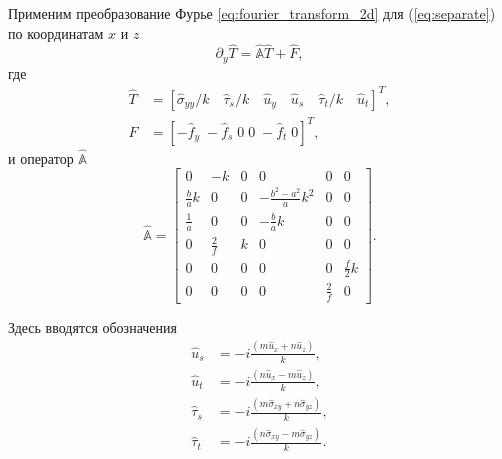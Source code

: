 Применим преобразование Фурье \eqref{eq:fourier_transform_2d} для (\ref{eq:separate}) по координатам $x$ и $z$
\begin{equation}
    \label{eq:FT_system}
    \partial_y \hat{T} = \hat{\mathbb{A}} \hat{T} + \hat{F},
\end{equation}
где
\begin{equation}
    \label{eq:FourierT}
    \begin{split}
        \hat{T} &= \left[\hat{\sigma}_{yy}/k \quad \hat{\tau}_s/k \quad \hat{u}_y \quad \hat{u}_s \quad  \hat{\tau}_t/k \quad  \hat{u}_t \right]^T, \\
        F &= \left[-\hat{f}_y \; -\hat{f}_s \; 0 \; 0 \; -\hat{f}_t \; 0\right]^T,
    \end{split}
\end{equation}
и оператор $\hat{\mathbb{A}}$
\begin{equation}
    \label{eq:FourierA}
    \hat{\mathbb{A}} = 
    \left[\begin{array}{cccccc}
        0 & -k & 0 & 0 & 0 & 0 \\
        \frac{b}{a}k & 0 & 0 & -\frac{b^2-a^2}{a}k^2 & 0 & 0 \\
        \frac{1}{a} & 0 & 0 & -\frac{b}{a}k & 0 & 0 \\
        0 & \frac{2}{f} & k & 0 & 0 & 0 \\
        0 & 0 & 0 & 0 & 0 & \frac{f}{2}k \\
        0 & 0 & 0 & 0 & \frac{2}{f} & 0 
    \end{array}\right].
\end{equation}

Здесь вводятся обозначения
\begin{equation}
    \label{eq:FT_special_variables}
    \begin{split}
        \hat{u}_s & = -i \frac{(m\hat{u}_x + n\hat{u}_z)}{k}, \\
        \hat{u}_t & = -i \frac{(n\hat{u}_x - m\hat{u}_z)}{k}, \\
        \hat{\tau}_s & = -i \frac{(m\hat{\sigma}_{xy} + n\hat{\sigma}_{yz})}{k}, \\
        \hat{\tau}_t & = -i \frac{(n\hat{\sigma}_{xy} - m\hat{\sigma}_{yz})}{k}. \\
    \end{split} 
\end{equation}

